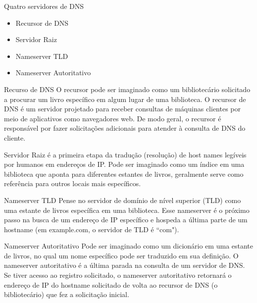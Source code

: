\documentclass{if-beamer}
\begin{document}
	\begin{frame}{Quatro servidores de DNS}
		\begin{itemize}
			\item Recursor de DNS
			\item Servidor Raiz
			\item Nameserver TLD
			\item Nameserver Autoritativo
		\end{itemize}
	\end{frame}
	
	\begin{frame}{Recurso de DNS}
	O recursor pode ser imaginado como um bibliotecário solicitado a procurar um livro específico em algum lugar de uma biblioteca. O recursor de DNS é um servidor projetado para receber consultas de máquinas clientes por meio de aplicativos como navegadores web. De modo geral, o recursor é responsável por fazer solicitações adicionais para atender à consulta de DNS do cliente.
	\end{frame}
%	
%	
	\begin{frame}{Servidor Raiz}
		é a primeira etapa da tradução (resolução) de host names legíveis por humanos em endereços de IP. Pode ser imaginado como um índice em uma biblioteca que aponta para diferentes estantes de livros, geralmente serve como referência para outros locais mais específicos.
	\end{frame}
%
%	
	\begin{frame}{Nameserver TLD}
		 Pense no servidor de domínio de nível superior (TLD) como uma estante de livros específica em uma biblioteca. Esse nameserver é o próximo passo na busca de um endereço de IP específico e hospeda a última parte de um hostname (em example.com, o servidor de TLD é ``com").
	\end{frame}
%	
%	
	\begin{frame}{Nameserver Autoritativo}
		 Pode ser imaginado como um dicionário em uma estante de livros, no qual um nome específico pode ser traduzido em sua definição. O nameserver autoritativo é a última parada na consulta de um servidor de DNS. Se tiver acesso ao registro solicitado, o nameserver autoritativo retornará o endereço de IP do hostname solicitado de volta ao recursor de DNS (o bibliotecário) que fez a solicitação inicial.
	\end{frame}
\end{document}
